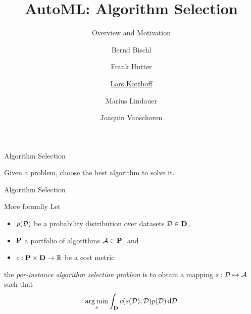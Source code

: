 




\title[AutoML: Overview]{AutoML: Algorithm Selection} %
\subtitle{Overview and Motivation} %
\author[Lars Kotthoff]{Bernd Bischl \and Frank Hutter \and \underline{Lars Kotthoff}\newline \and Marius Lindauer \and Joaquin Vanschoren}
\institute{}
\date{}





	
	\maketitle
	


\begin{frame}[c]{Algorithm Selection}
    \begin{center}
        \Large{Given a problem, choose the best algorithm to solve it.} 
    \end{center}
\end{frame}

\begin{frame}[c]{Algorithm Selection}
\begin{block}{More formally}
        Let 
        \begin{itemize}
                \item $p(\mathcal{D})$ be a probability distribution over datasets $\mathcal{D} \in \mathbf{D}$,
                \item $\mathbf{P}$ a portfolio of algorithms $\mathcal{A} \in \mathbf{P}$, and
                \item $c: \mathbf{P} \times \mathbf{D} \rightarrow \mathbb{R}$ be a cost metric   
        \end{itemize}
        
        the \emph{per-instance algorithm selection problem} is to obtain a mapping 
        $s: \mathcal{D} \mapsto \mathcal{A}$ 
        such that
        $$\operatorname*{arg\,min}_{s} \int_{\mathbf{D}} c(s(\mathcal{D}),\mathcal{D}) p(\mathcal{D}) \mathop{}\!\mathrm{d}\mathcal{D}$$
\end{block}

\end{frame}

